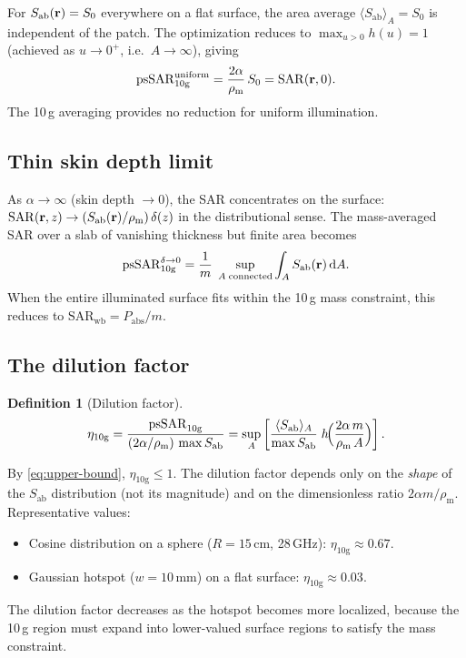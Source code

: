 \documentclass[11pt,a4paper]{article}
\theoremstyle{definition}
\newtheorem{definition}[theorem]{Definition}
\theoremstyle{remark}
\newcommand{\Sab}{S_{\mathrm{ab}}}
\newcommand{\SAR}{\ensuremath{\mathrm{SAR}}}
\newcommand{\psSAR}{\ensuremath{\mathrm{psSAR}_{10\mathrm{g}}}}
\newcommand{\rhom}{\rho_{\mathrm{m}}}
\begin{document}
For $\Sab(\vb{r}) = S_0$ everywhere on a flat surface, the area average
$\langle\Sab\rangle_A = S_0$ is independent of the patch. The optimization
reduces to $\max_{u > 0} h(u) = 1$ (achieved as $u \to 0^+$, i.e.\
$A \to \infty$), giving
\begin{equation}\label{eq:uniform-flat}
  \psSAR^{\mathrm{uniform}} = \frac{2\alpha}{\rhom}\,S_0
  = \SAR(\vb{r}, 0).
\end{equation}
The 10\,g averaging provides no reduction for uniform illumination.

\subsection{Thin skin depth limit}

As $\alpha \to \infty$ (skin depth $\to 0$), the SAR concentrates on the
surface: $\SAR(\vb{r},z) \to (\Sab(\vb{r})/\rhom)\,\delta(z)$ in the
distributional sense. The mass-averaged SAR over a slab of vanishing thickness
but finite area becomes
\begin{equation}\label{eq:thin-limit}
  \psSAR^{\delta\to 0}
  = \frac{1}{m}\;\sup_{\substack{A\;\text{connected}}}
    \int_A \Sab(\vb{r})\,\mathrm{d}A.
\end{equation}
When the entire illuminated surface fits within the 10\,g mass constraint,
this reduces to $\SAR_{\mathrm{wb}} = P_{\mathrm{abs}}/m$.

\subsection{The dilution factor}

\begin{definition}[Dilution factor]\label{def:dilution}
\begin{equation}\label{eq:dilution}
  \eta_{10\mathrm{g}}
  = \frac{\psSAR}{(2\alpha/\rhom)\,\max\Sab}
  = \sup_A\left[
    \frac{\langle\Sab\rangle_A}{\max\Sab}\;
    h\!\Bigl(\frac{2\alpha\,m}{\rhom\,A}\Bigr)
  \right].
\end{equation}
\end{definition}
By \cref{eq:upper-bound}, $\eta_{10\mathrm{g}} \leq 1$.
The dilution factor depends only on the \emph{shape} of the $\Sab$ distribution
(not its magnitude) and on the dimensionless ratio $2\alpha m/\rhom$.
Representative values:
\begin{itemize}[nosep]
\item Cosine distribution on a sphere ($R = 15$\,cm, 28\,GHz):
  $\eta_{10\mathrm{g}} \approx 0.67$.
\item Gaussian hotspot ($w = 10$\,mm) on a flat surface:
  $\eta_{10\mathrm{g}} \approx 0.03$.
\end{itemize}
The dilution factor decreases as the hotspot becomes more localized, because the
10\,g region must expand into lower-valued surface regions to satisfy the mass
constraint.
\end{document}
